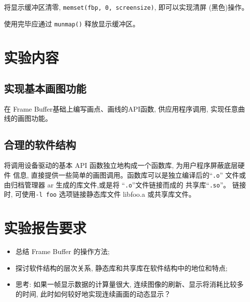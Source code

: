 将显示缓冲区清零, \verb|memset(fbp, 0, screensize)|, 即可以实现清屏
(黑色)操作。

使用完毕应通过 \verb|munmap()| 释放显示缓冲区。
\section{实验内容}
\subsection{实现基本画图功能}
在 Frame Buffer基础上编写画点、画线的API函数, 供应用程序调用,
实现任意曲线的画图功能。

\subsection{合理的软件结构}
将调用设备驱动的基本 API 函数独立地构成一个函数库, 为用户程序屏蔽底层硬件
信息, 直接提供一些简单的画图调用。函数库可以是独立编译后的``\verb|.o|''
文件或由归档管理器 ar 生成的库文件,或是将 ``\verb|.o|''文件链接而成的
共享库``\verb|.so|''。
链接时, 可使用\verb|-l foo| 选项链接静态库文件 libfoo.a 或共享库文件。

\section{实验报告要求}
\begin{itemize}
    \item 总结 Frame Buffer 的操作方法;
    \item 探讨软件结构的层次关系, 静态库和共享库在软件结构中的地位和特点;
    \item 思考: 如果一帧显示数据的计算量很大, 连续图像的刷新、显示将消耗比较多
        的时间, 此时如何较好地实现连续画面的动态显示？
\end{itemize}
